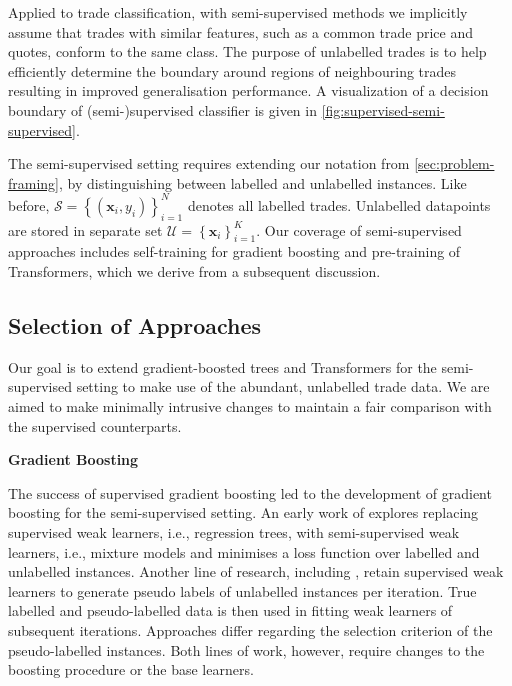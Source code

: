 Applied to trade classification, with semi-supervised methods we implicitly assume that trades with similar features, such as a common trade price and quotes, conform to the same class. The purpose of unlabelled trades is to help efficiently determine the boundary around regions of neighbouring trades resulting in improved generalisation performance. A visualization of a decision boundary of (semi-)supervised classifier is given in \cref{fig:supervised-semi-supervised}.

The semi-supervised setting requires extending our notation from \cref{sec:problem-framing}, by distinguishing between labelled and unlabelled instances. Like before, $\mathcal{S}=\left\{\left(\mathbf{x}_i, y_i\right)\right\}_{i=1}^N$ denotes all labelled trades. Unlabelled datapoints are stored in separate set $\mathcal{U} = \left\{\mathbf{x}_i\right\}_{i=1}^{K}$. Our coverage of semi-supervised approaches includes self-training for gradient boosting and pre-training of Transformers, which we derive from a subsequent discussion.

\subsection{Selection of Approaches}\label{sec:selection-of-approaches-1}

Our goal is to extend gradient-boosted trees and Transformers for the semi-supervised setting to make use of the abundant, unlabelled trade data. We are aimed to make minimally intrusive changes to maintain a fair comparison with the supervised counterparts.

\textbf{Gradient Boosting}

The success of supervised gradient boosting led to the development of gradient boosting for the semi-supervised setting. An early work of \textcite[][3--4]{dalche-bucSemisupervisedMarginBoost2001} explores replacing supervised weak learners, i.e., regression trees, with semi-supervised weak learners, i.e., mixture models and minimises a loss function over labelled and unlabelled instances. Another line of research, including \textcites[][290--291]{bennettExploitingUnlabeledData2002}[][2003--2004]{mallapragadaSemiBoostBoostingSemiSupervised2009}, retain supervised weak learners to generate pseudo labels of unlabelled instances per iteration. True labelled and pseudo-labelled data is then used in fitting weak learners of subsequent iterations. Approaches differ regarding the selection criterion of the pseudo-labelled instances. Both lines of work, however, require changes to the boosting procedure or the base learners.

